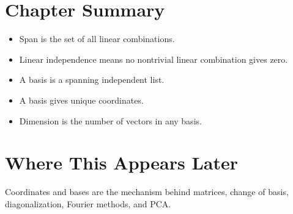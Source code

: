 \section*{Chapter Summary}

\begin{itemize}
  \item Span is the set of all linear combinations.
  \item Linear independence means no nontrivial linear combination gives zero.
  \item A basis is a spanning independent list.
  \item A basis gives unique coordinates.
  \item Dimension is the number of vectors in any basis.
\end{itemize}

\section*{Where This Appears Later}

Coordinates and bases are the mechanism behind matrices, change of basis,
diagonalization, Fourier methods, and PCA.


